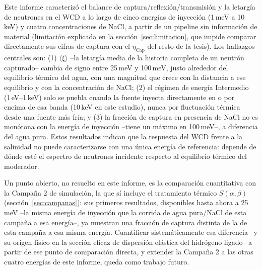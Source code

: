 \documentclass[11pt,a4paper]{article}
\begin{document}
Este informe caracterizó el balance de captura/reflexión/transmisión y la letargía de neutrones en
el WCD a lo largo de cinco energías de inyección (1\,meV a 10\,keV) y cuatro concentraciones de
NaCl, a partir de un pipeline sin información de material (limitación explicada en la
sección~\ref{sec:limitacion}, que impide comparar directamente sus cifras de captura con el
$\eta_{\text{Cap}}$ del resto de la tesis). Los hallazgos centrales son: (1) $\langle\xi\rangle$
--la letargía media de la historia completa de un neutrón capturado-- cambia de signo entre 25\,meV
y 100\,meV, justo alrededor del equilibrio térmico del agua, con una magnitud que crece con la
distancia a ese equilibrio y con la concentración de NaCl; (2) el régimen de energía Intermedio
(1\,eV--1\,keV) solo se puebla cuando la fuente inyecta directamente en o por encima de esa banda
(10\,keV en este estudio), nunca por fluctuación térmica desde una fuente más fría; y (3) la fracción
de captura en presencia de NaCl no es monótona con la energía de inyección --tiene un máximo en
100\,meV--, a diferencia del agua pura. Estos resultados indican que la respuesta del WCD frente a la
salinidad no puede caracterizarse con una única energía de referencia: depende de dónde esté el
espectro de neutrones incidente respecto al equilibrio térmico del moderador.

\label{sec:futuro}
Un punto abierto, no resuelto en este informe, es la comparación cuantitativa con la Campaña 2 de
simulación, la que sí incluye el tratamiento térmico $S(\alpha,\beta)$ (sección~\ref{sec:campanas}):
sus primeros resultados, disponibles hasta ahora a 25\,meV --la misma energía de inyección que la
corrida de agua pura/NaCl de esta campaña a esa energía--, ya muestran una fracción de captura
distinta de la de esta campaña a esa misma energía. Cuantificar sistemáticamente esa diferencia --y
su origen físico en la sección eficaz de dispersión elástica del hidrógeno ligado-- a partir de ese
punto de comparación directa, y extender la Campaña 2 a las otras cuatro energías de este informe,
queda como trabajo futuro.
\end{document}
